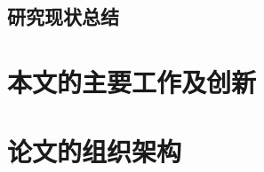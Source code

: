 \subsection[\hspace{-2pt}研究现状总结]{{ \hspace{-8pt}}研究现状总结}\label{section 1-2-4}

\section[\hspace{-2pt}本文的主要工作及创新]{{ \hspace{-8pt}本文的主要工作及创新}}\label{section 1-3}


\section[\hspace{-2pt}论文的组织架构]{{ \hspace{-8pt}论文的组织架构}}\label{section 1-4}





